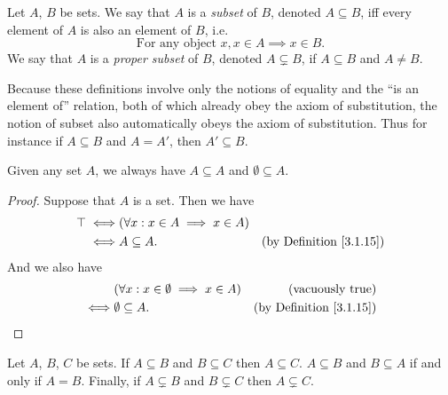 \begin{definition}[Subsets]\label{3.1.15}
    Let \(A\), \(B\) be sets.
    We say that \(A\) is a \emph{subset} of \(B\), denoted \(A \subseteq B\), iff every element of \(A\) is also an element of \(B\), i.e.
    \[
        \text{For any object } x, x \in A \implies x \in B.
    \]
    We say that \(A\) is a \emph{proper subset} of \(B\), denoted \(A \subsetneq B\), if \(A \subseteq B\) and \(A \neq B\).
\end{definition}

\begin{remark}\label{3.1.16}
    Because these definitions involve only the notions of equality and the ``is an element of'' relation, both of which already obey the axiom of substitution, the notion of subset also automatically obeys the axiom of substitution.
    Thus for instance if \(A \subseteq B\) and \(A = A'\), then \(A' \subseteq B\).
\end{remark}

\begin{example}\label{3.1.17}
    Given any set \(A\), we always have \(A \subseteq A\) and \(\emptyset \subseteq A\).
\end{example}

\begin{proof}
    Suppose that \(A\) is a set.
    Then we have
    \begin{align*}
        \top \iff & (\forall x : x \in A \implies x \in A)                                       \\
        \iff      & A \subseteq A.                         & \text{(by Definition \ref{3.1.15})}
    \end{align*}
    And we also have
    \begin{align*}
             & (\forall x : x \in \emptyset \implies x \in A) & \text{(vacuously true)}             \\
        \iff & \emptyset \subseteq A.                         & \text{(by Definition \ref{3.1.15})}
    \end{align*}
\end{proof}

\begin{proposition}\label{3.1.18}
    Let \(A\), \(B\), \(C\) be sets.
    If \(A \subseteq B\) and \(B \subseteq C\) then \(A \subseteq C\).
    \(A \subseteq B\) and \(B \subseteq A\) if and only if \(A = B\).
    Finally, if \(A \subsetneq B\) and \(B \subsetneq C\) then \(A \subsetneq C\).
\end{proposition}

